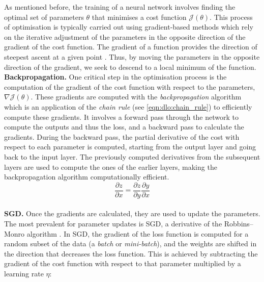 As mentioned before, the training of a neural network involves finding the
optimal set of parameters $\theta$ that minimises a cost function
$\mathcal{J}(\theta)$. This process of optimisation is typically carried out
using gradient-based methods which rely on the iterative adjustment of the
parameters in the opposite direction of the gradient of the cost function. The
gradient of a function provides the direction of steepest ascent at a given
point \cite{boyd2004convex}. Thus, by moving the parameters in the opposite
direction of the gradient, we seek to descend to a local minimum of the
function.\\

\noindent \textbf{Backpropagation.} One critical step in the optimisation
process is the computation of the gradient of the cost function with respect to
the parameters, $\nabla \mathcal{J}(\theta)$. These gradients are computed with
the \emph{backpropagation} algorithm \cite{rumelhart1986learning} which is an
application of the \emph{chain rule} (see \cref{eqn:dlo:chain_rule}) to
efficiently compute these gradients. It involves a forward pass through the
network to compute the outputs and thus the loss, and a backward pass to
calculate the gradients. During the backward pass, the partial derivative of the
cost with respect to each parameter is computed, starting from the output layer
and going back to the input layer. The previously computed derivatives from the
subsequent layers are used to compute the ones of the earlier layers,  
making the backpropagation algorithm computationally efficient.\\

\begin{equation}
  \label{eqn:dlo:chain_rule}
  \frac{\partial z}{\partial x} = \frac{\partial z}{\partial y} \frac{\partial y}{\partial x}
\end{equation}\\

\noindent \textbf{\acl{SGD}.} Once the gradients are calculated, they are
used to update the parameters. The most prevalent for parameter updates is
\acf{SGD}, a derivative of the Robbins–Monro algorithm
\cite{robbins1951stochastic}. In \ac{SGD}, the gradient of the loss function is
computed for a random subset of the data (a \emph{batch} or \emph{mini-batch}),
and the weights are shifted in the direction that decreases the loss function.
This is achieved by subtracting the gradient of the cost function with respect
to that parameter multiplied by a learning rate $\eta$:\\

